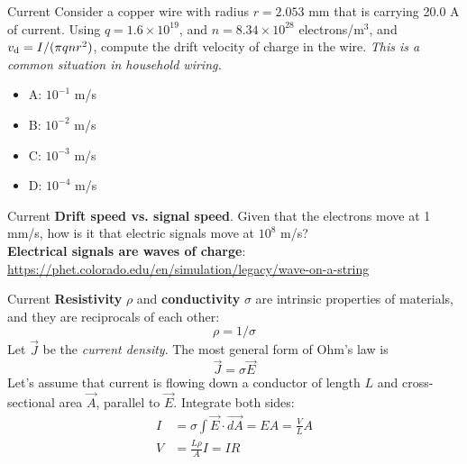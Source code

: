 \documentclass{beamer}
\begin{document}
\begin{frame}{Current}
Consider a copper wire with radius $r = 2.053$ mm that is carrying 20.0 A of current.  Using $q = 1.6\times 10^{19}$, and $n = 8.34 \times 10^{28}$ electrons/m$^3$, and $v_{\rm d} = I/(\pi q n r^2)$, compute the drift velocity of charge in the wire.  \textit{This is a common situation in household wiring.}
\begin{itemize}
\item A: $10^{-1}$ m/s
\item B: $10^{-2}$ m/s
\item C: $10^{-3}$ m/s
\item D: $10^{-4}$ m/s
\end{itemize}
\end{frame}

\begin{frame}{Current}
\textbf{Drift speed vs. signal speed}.  Given that the electrons move at 1 mm/s, how is it that electric signals move at $10^8$ m/s? \\ \vspace{1cm}
\textbf{Electrical signals are \alert{waves} of charge}: \\ \url{https://phet.colorado.edu/en/simulation/legacy/wave-on-a-string}
\end{frame}

\begin{frame}{Current}
\textbf{Resistivity} $\rho$ and \textbf{conductivity} $\sigma$ are intrinsic properties of materials, and they are reciprocals of each other:
\begin{equation}
\rho = 1/\sigma
\end{equation}
Let $\vec{J}$ be the \textit{current density}.  The most general form of Ohm's law is
\begin{equation}
\boxed{
\vec{J} = \sigma \vec{E}}
\end{equation}
Let's assume that current is flowing down a conductor of length $L$ and cross-sectional area $\vec{A}$, parallel to $\vec{E}$.  Integrate both sides:
\begin{align}
I &= \sigma \int \vec{E} \cdot \vec{dA} = E A = \frac{V}{L} A \\
V &= \frac{L \rho}{A} I = I R
\end{align} 
\end{frame}
\end{document}
